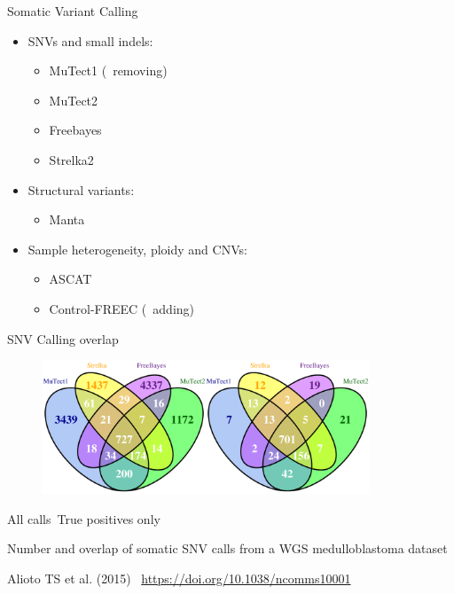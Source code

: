 \documentclass[usepdftitle=false]{beamer}
\begin{document}
\begin{frame}{Somatic Variant Calling}
	\begin{itemize}
		\item SNVs and small indels:
		\pause
		\begin{itemize}
			\item MuTect1 (\faWrench\ removing)
			\item MuTect2
			\item Freebayes
			\item Strelka2
		\end{itemize}
		\pause
		\item Structural variants:
		\pause
		\begin{itemize}
			\item Manta
		\end{itemize}
		\pause
		\item Sample heterogeneity, ploidy and CNVs:
		\pause
		\begin{itemize}
			\item ASCAT
			\item Control-FREEC (\faWrench\ adding)
		\end{itemize}
	\end{itemize}
\end{frame}



\begin{frame}{SNV Calling overlap}
	\begin{figure}
		\includegraphics[height=4cm]{pictures/Sarek_venn_Calls.png}
	\end{figure}
		\vspace{-.5cm}
		\begin{center}
			\small{All calls\hspace{2cm}\ True positives only}
		\end{center}

		\small{Number and overlap of somatic SNV calls from a WGS medulloblastoma dataset}

	\small{Alioto TS et al. (2015) \aiDoi\ \url{https://doi.org/10.1038/ncomms10001}}
\end{frame}
\end{document}
